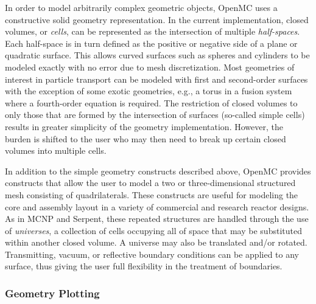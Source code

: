 \documentclass{snamc2013}
\begin{document}
In order to model arbitrarily complex geometric objects, OpenMC uses a
constructive solid geometry representation. In the current implementation,
closed volumes, or \textit{cells}, can be represented as the intersection of
multiple \textit{half-spaces}. Each half-space is in turn defined as the
positive or negative side of a plane or quadratic surface. This allows curved
surfaces such as spheres and cylinders to be modeled exactly with no error due
to mesh discretization. Most geometries of interest in particle transport can be
modeled with first and second-order surfaces with the exception of some exotic
geometries, e.g., a torus in a fusion system where a fourth-order equation is
required. The restriction of closed volumes to only those that are formed by the
intersection of surfaces (so-called simple cells) results in greater simplicity
of the geometry implementation. However, the burden is shifted to the user who
may then need to break up certain closed volumes into multiple cells.

In addition to the simple geometry constructs described above, OpenMC provides
constructs that allow the user to model a two or three-dimensional structured
mesh consisting of quadrilaterals. These constructs are useful for modeling the
core and assembly layout in a variety of commercial and research reactor
designs. As in MCNP and Serpent, these repeated structures are handled through
the use of \textit{universes}, a collection of cells occupying all of space that
may be substituted within another closed volume. A universe may also be
translated and/or rotated. Transmitting, vacuum, or reflective boundary
conditions can be applied to any surface, thus giving the user full flexibility
in the treatment of boundaries.

\subsubsection{Geometry Plotting}
\end{document}
